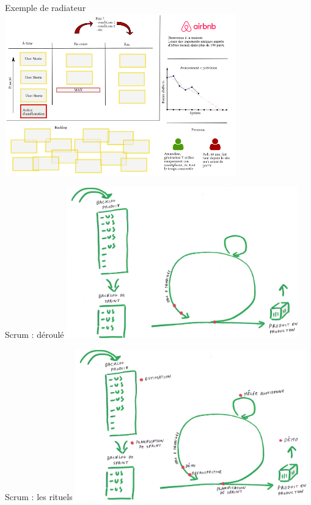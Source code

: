 \documentclass{beamer}
\begin{document}
\begin{frame}{Exemple de radiateur}
  \center
  \includegraphics[width=10cm]{includes/radiateur}
\end{frame}

\begin{frame}{Scrum : déroulé}
  \center
  \includegraphics[width=10cm]{includes/scrum1}
\end{frame}

\begin{frame}{Scrum : les rituels}
  \center
  \includegraphics[width=10cm]{includes/scrum2}
\end{frame}
\end{document}
